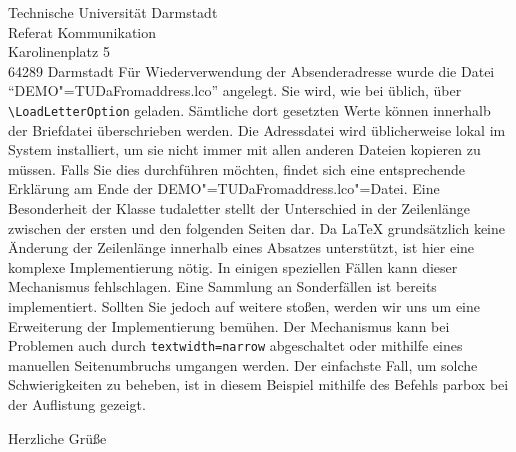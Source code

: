 \documentclass[
	ngerman,%
	accentcolor=9c,%
	premium=true,%
]{tudaletter}
\begin{document}
\begin{letter}{%
	Technische Universität Darmstadt\\%
	Referat Kommunikation\\%
	Karolinenplatz 5\\%
	64289 Darmstadt}
Für Wiederverwendung der Absenderadresse wurde die Datei \enquote{DEMO"=TUDaFromaddress.lco} angelegt. Sie wird, wie bei \KOMAScript{} üblich, über \verb+\LoadLetterOption+ geladen. Sämtliche dort gesetzten Werte können innerhalb der Briefdatei überschrieben werden.
Die Adressdatei wird üblicherweise lokal im System installiert, um sie nicht immer mit allen anderen Dateien kopieren zu müssen. Falls Sie dies durchführen möchten, findet sich eine entsprechende Erklärung am Ende der DEMO"=TUDaFromaddress.lco"=Datei.
Eine Besonderheit der Klasse tudaletter stellt der Unterschied in der Zeilenlänge zwischen der ersten und den folgenden Seiten dar. Da \LaTeX{} grundsätzlich keine Änderung der Zeilenlänge innerhalb eines Absatzes unterstützt, ist hier eine komplexe Implementierung nötig. In einigen speziellen Fällen kann dieser Mechanismus fehlschlagen. Eine Sammlung an Sonderfällen ist bereits implementiert. Sollten Sie jedoch auf weitere stoßen, werden wir uns um eine Erweiterung der Implementierung bemühen. Der Mechanismus kann bei Problemen auch durch \verb+textwidth=narrow+ abgeschaltet oder mithilfe eines manuellen Seitenumbruchs umgangen werden.
Der einfachste Fall, um solche Schwierigkeiten zu beheben, ist in diesem Beispiel mithilfe des Befehls parbox bei der Auflistung gezeigt.

\closing{Herzliche Grüße}


\end{letter}
\end{document}
